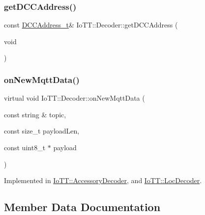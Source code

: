 \subsubsection{\texorpdfstring{get\+D\+C\+C\+Address()}{getDCCAddress()}}
{\footnotesize\ttfamily const \hyperlink{namespaceIoTT_a31b8cd9473fc447b3fb341b78afa54fe}{D\+C\+C\+Address\+\_\+t}\& Io\+T\+T\+::\+Decoder\+::get\+D\+C\+C\+Address (\begin{DoxyParamCaption}\item[{void}]{ }\end{DoxyParamCaption})\hspace{0.3cm}{\ttfamily [inline]}}

\mbox{\label{classIoTT_1_1Decoder_aba63fd0a28594e3b23fb6e436417e325}} 
\subsubsection{\texorpdfstring{on\+New\+Mqtt\+Data()}{onNewMqttData()}}
{\footnotesize\ttfamily virtual void Io\+T\+T\+::\+Decoder\+::on\+New\+Mqtt\+Data (\begin{DoxyParamCaption}\item[{const string \&}]{topic,  }\item[{const size\+\_\+t}]{payload\+Len,  }\item[{const uint8\+\_\+t $\ast$}]{payload }\end{DoxyParamCaption})\hspace{0.3cm}{\ttfamily [pure virtual]}}



Implemented in \hyperlink{classIoTT_1_1AccessoryDecoder_a2aefba75fd586b25e37f8ea03deda7e7}{Io\+T\+T\+::\+Accessory\+Decoder}, and \hyperlink{classIoTT_1_1LocDecoder_a7d2faa51ae31ee25ed63ebaefbda5d78}{Io\+T\+T\+::\+Loc\+Decoder}.



\subsection{Member Data Documentation}
\mbox{\label{classIoTT_1_1Decoder_a441119df006f3149f44321369cbc5882}} 
